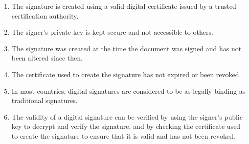 \documentclass[11pt]{article}
\begin{document}
\begin{enumerate}
\begin{enumerate}
              \item The signature is created using a valid digital certificate issued by a trusted certification authority.
              \item The signer's private key is kept secure and not accessible to others.
              \item The signature was created at the time the document was signed and has not been altered since then.
              \item The certificate used to create the signature has not expired or been revoked.
              \item In most countries, digital signatures are considered to be as legally binding as traditional signatures.
              \item The validity of a digital signature can be verified by using the signer's public key to decrypt and verify the signature, and by checking the certificate used to create the signature to ensure that it is valid and has not been revoked.
          \end{enumerate}
\end{enumerate}
\end{document}
